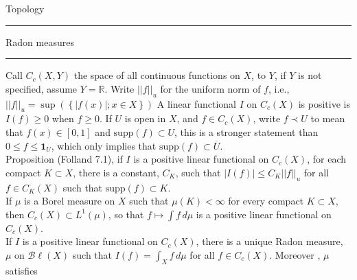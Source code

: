 \documentclass[12pt]{article}
\newcommand{ \cf }[1] { \mathbf{1}_{#1} }
\newcommand{\reals}[0] { \mathbb{R}}
\newcommand{\Bl}[0] { \mathcal{B} \ell }
\newcommand{ \supp } { \textrm{supp} }
\newcommand{ \SUP }[1] { \sup \left( \left\{ #1 \right\} \right) }
\begin{document}
\break

\begin{flushleft}
Topology
\end{flushleft}

\hrule


























\break

\begin{flushleft}
Radon measures\\
\end{flushleft}

\hrule

\vspace{0.5in}


Call $C_c(X,Y)$ the space of all continuous functions on $X$, to $Y$, if $Y$ is not specified, assume $Y = \reals$. Write $||f||_u$ for the uniform norm of $f$, i.e., $||f||_u = \SUP{ |f(x)|; x \in X }$ A linear functional $I$ on $C_c(X)$ is positive is $I(f) \ge 0$ when $f \ge 0$. If $U$ is open in $X$, and $f \in C_c(X)$, write $f \prec U$ to mean that $f(x) \in [0,1]$ and $\supp(f) \subset U$, this is a stronger statement than $0 \le f \le \cf{U}$, which only implies that $\supp(f) \subset \overline{U}$. \\



Proposition (Folland 7.1), if $I$ is a positive linear functional on $C_c(X)$, for each compact $K \subset X$, there is a constant, $C_K$, such that $|I(f)| \le C_K ||f||_u$ for all $f \in C_K(X)$ such that $\supp(f) \subset K$. \\

If $\mu$ is a Borel measure on $X$ such that $\mu(K) < \infty$ for every compact $K \subset X$, then $C_c(X) \subset L^1(\mu)$, so that $ f \mapsto \int f \, d\mu$ is a positive linear functional on $C_c(X)$. \\



If $I$ is a positive linear functional on $C_c(X)$, there is a unique Radon measure, $\mu$ on $\Bl(X)$ such that $I(f) = \int_X f \, d\mu$ for all $f \in C_c(X)$. Moreover , $\mu$ satisfies
\end{document}
